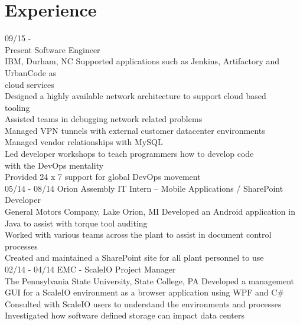 \documentclass[]{friggeri-cv}
\begin{document}
\section{Experience}
\begin{entrylist}
  \entry
    {09/15 - \\Present}
    {Software Engineer}
    {\\IBM, Durham, NC}
    {Supported applications such as Jenkins, Artifactory and UrbanCode as \\cloud services\\
    Designed a highly available network architecture to support cloud based \\tooling\\
    Assisted teams in debugging network related problems\\
    Managed VPN tunnels with external customer datacenter environments\\
    Managed vendor relationships with MySQL\\
    Led developer workshops to teach programmers how to develop code \\with the DevOps mentality\\
    Provided 24 x 7 support for global DevOps movement\\}
  \entry
    {05/14 - 08/14}
    {Orion Assembly IT Intern – Mobile Applications / SharePoint Developer}
    {\\General Motors Company, Lake Orion, MI}
    {Developed an Android application in Java to assist with torque tool auditing\\
    Worked with various teams across the plant to assist in document control processes\\
    Created and maintained a SharePoint site for all plant personnel to use\\}
  \entry
    {02/14 - 04/14}
    {EMC - ScaleIO Project Manager}
    {\\The Pennsylvania State University, State College, PA}
    {Developed a management GUI for a ScaleIO environment as a browser application using WPF and C#\\
    Consulted with ScaleIO users to understand the environments and processes\\
    Investigated how software defined storage can impact data centers\\}

\end{entrylist}
\end{document}
